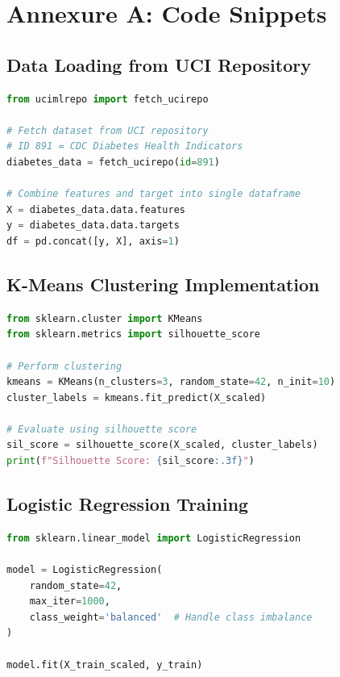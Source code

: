 \documentclass[12pt,a4paper]{article}
\begin{document}
\newpage
\appendix

\section{Annexure A: Code Snippets}

\subsection{Data Loading from UCI Repository}

\begin{lstlisting}[language=Python, caption=Programmatic data loading using ucimlrepo package]
from ucimlrepo import fetch_ucirepo

# Fetch dataset from UCI repository
# ID 891 = CDC Diabetes Health Indicators
diabetes_data = fetch_ucirepo(id=891)

# Combine features and target into single dataframe
X = diabetes_data.data.features
y = diabetes_data.data.targets
df = pd.concat([y, X], axis=1)
\end{lstlisting}

\subsection{K-Means Clustering Implementation}

\begin{lstlisting}[language=Python, caption=K-Means clustering with k=3 and evaluation]
from sklearn.cluster import KMeans
from sklearn.metrics import silhouette_score

# Perform clustering
kmeans = KMeans(n_clusters=3, random_state=42, n_init=10)
cluster_labels = kmeans.fit_predict(X_scaled)

# Evaluate using silhouette score
sil_score = silhouette_score(X_scaled, cluster_labels)
print(f"Silhouette Score: {sil_score:.3f}")
\end{lstlisting}

\subsection{Logistic Regression Training}

\begin{lstlisting}[language=Python, caption=Logistic regression with balanced class weights]
from sklearn.linear_model import LogisticRegression

model = LogisticRegression(
    random_state=42,
    max_iter=1000,
    class_weight='balanced'  # Handle class imbalance
)

model.fit(X_train_scaled, y_train)
\end{lstlisting}
\end{document}
